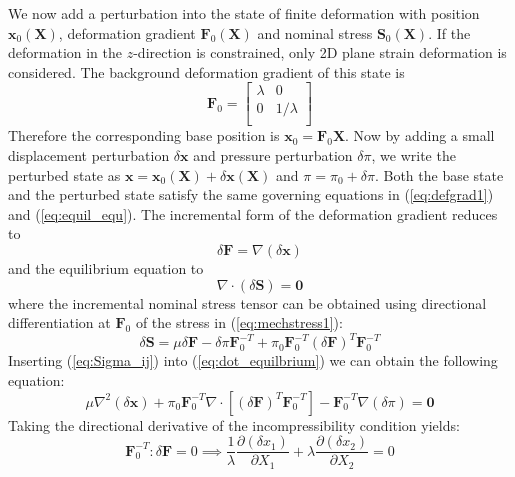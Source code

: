 \documentclass[final,3p,times]{elsarticle}
\begin{document}
We now add a perturbation into the state of finite deformation with position $\mathbf{x}_{0}(\mathbf{X})$, deformation gradient $\mathbf{F}_{0}(\mathbf{X})$ and nominal stress $\mathbf{S}_{0}(\mathbf{X})$. If the deformation in the $z$-direction is constrained, only 2D plane strain deformation is considered. The background deformation gradient of this state is
\begin{equation}
\mathbf{F}_{0}=
	\begin{bmatrix}
		\lambda & 0  \\
		0 & 1/\lambda \\
	\end{bmatrix}
\end{equation}
Therefore the corresponding base position is $\mathbf{x}_0 = \mathbf{F}_{0}\mathbf{X}$. Now by adding a small displacement perturbation $\delta\mathbf{x}$ and pressure perturbation $\delta\pi$, we write the perturbed state as $\mathbf{x} = \mathbf{x}_{0}(\mathbf{X})+ \delta\mathbf{x}(\mathbf{X})$ and $\pi = \pi_0 + \delta\pi$. Both the base state and the perturbed state satisfy the same governing equations in (\ref{eq:defgrad1}) and (\ref{eq:equil_equ}). The incremental form of the deformation gradient reduces to
\begin{equation}
	\delta\mathbf{F}=\nabla(\delta\mathbf{x})
	\label{eq:defgraddot}	
\end{equation}
and the equilibrium equation to
\begin{equation}
	\nabla \cdot (\delta\mathbf{S}) = \mathbf{0}
	\label{eq:dot_equilbrium}
\end{equation}
where the incremental nominal stress tensor can be obtained using directional differentiation at $\mathbf{F}_{0}$ of the stress in (\ref{eq:mechstress1}):
\begin{equation}
	\delta\mathbf{S}=\mu \delta\mathbf{F} - \delta\pi \mathbf{F}^{-T}_{0} + \pi_{0} \mathbf{F}^{-T}_{0} (\delta\mathbf{F})^T \mathbf{F}^{-T}_{0}
	\label{eq:Sigma_ij}
\end{equation}
Inserting (\ref{eq:Sigma_ij}) into (\ref{eq:dot_equilbrium}) we can obtain the following equation:
\begin{equation}
	\mu \nabla^2 (\delta\mathbf{x}) + \pi_{0} \mathbf{F}^{-T}_{0} \nabla \cdot \left[ (\delta\mathbf{F})^T \mathbf{F}^{-T}_{0} \right] - \mathbf{F}^{-T}_{0} \nabla (\delta\pi) = \mathbf{0}
	\label{eq:dotequil1}
\end{equation}
Taking the directional derivative of the incompressibility condition yields:
\begin{equation}
	\mathbf{F}^{-T}_{0} : \delta\mathbf{F}=0 \implies \frac{1}{\lambda}\frac{\partial(\delta x_1)}{\partial X_1} + \lambda\frac{\partial(\delta x_2)}{\partial X_2} = 0
	\label{eq:icompressdot}
\end{equation}
\end{document}
